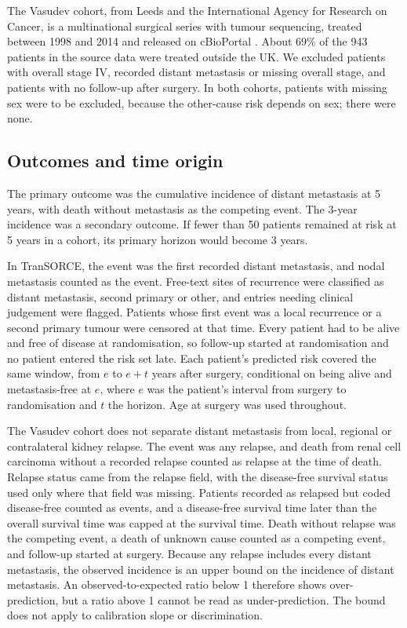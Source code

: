\documentclass[11pt,a4paper]{article}
\begin{document}
The Vasudev cohort, from Leeds and the International Agency for Research on Cancer, is a multinational surgical series with tumour sequencing, treated between 1998 and 2014 and released on cBioPortal \cite{Vasudev_2023}.
About 69\% of the 943 patients in the source data were treated outside the UK.
We excluded patients with overall stage IV, recorded distant metastasis or missing overall stage, and patients with no follow-up after surgery.
In both cohorts, patients with missing sex were to be excluded, because the other-cause risk depends on sex; there were none.

\subsection*{Outcomes and time origin}

The primary outcome was the cumulative incidence of distant metastasis at 5 years, with death without metastasis as the competing event.
The 3-year incidence was a secondary outcome.
If fewer than 50 patients remained at risk at 5 years in a cohort, its primary horizon would become 3 years.

In TranSORCE, the event was the first recorded distant metastasis, and nodal metastasis counted as the event.
Free-text sites of recurrence were classified as distant metastasis, second primary or other, and entries needing clinical judgement were flagged.
Patients whose first event was a local recurrence or a second primary tumour were censored at that time.
Every patient had to be alive and free of disease at randomisation, so follow-up started at randomisation and no patient entered the risk set late.
Each patient's predicted risk covered the same window, from $e$ to $e + t$ years after surgery, conditional on being alive and metastasis-free at $e$, where $e$ was the patient's interval from surgery to randomisation and $t$ the horizon.
Age at surgery was used throughout.

The Vasudev cohort does not separate distant metastasis from local, regional or contralateral kidney relapse.
The event was any relapse, and death from renal cell carcinoma without a recorded relapse counted as relapse at the time of death.
Relapse status came from the relapse field, with the disease-free survival status used only where that field was missing.
Patients recorded as relapsed but coded disease-free counted as events, and a disease-free survival time later than the overall survival time was capped at the survival time.
Death without relapse was the competing event, a death of unknown cause counted as a competing event, and follow-up started at surgery.
Because any relapse includes every distant metastasis, the observed incidence is an upper bound on the incidence of distant metastasis.
An observed-to-expected ratio below 1 therefore shows over-prediction, but a ratio above 1 cannot be read as under-prediction.
The bound does not apply to calibration slope or discrimination.
\end{document}

